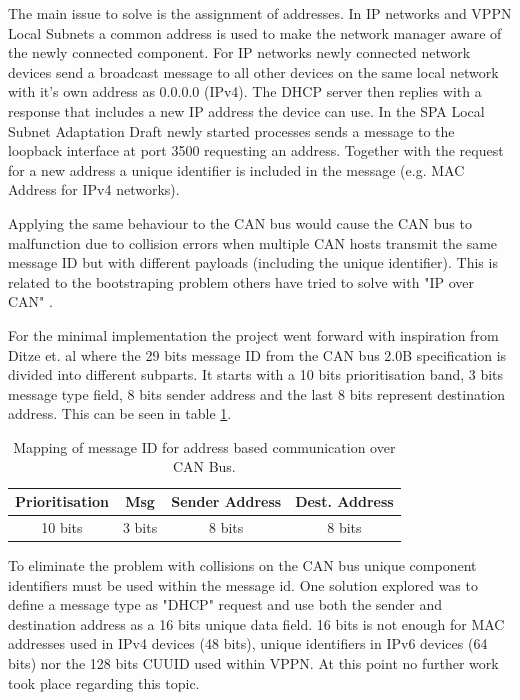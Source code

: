 The main issue to solve is the assignment of addresses. In IP networks and VPPN Local
Subnets a common address is used to make the network manager aware of the newly
connected component. For IP networks newly connected network devices send a
broadcast message to all other devices on the same local network with it's own
address as 0.0.0.0 (IPv4). The DHCP server then replies with a response that
includes a new IP address the device can use. In the SPA Local Subnet
Adaptation Draft newly started processes sends a message to the loopback
interface at port 3500 requesting an address. Together with the request for a
new address a unique identifier is included in the message (e.g. MAC Address
for IPv4 networks).

Applying the same behaviour to the CAN bus would cause the CAN bus to
malfunction due to collision errors when multiple CAN hosts transmit the same
message ID but with different payloads (including the unique identifier).
This is related to the bootstraping problem others have tried to solve with
"IP over CAN" \cite{web:draft-ip_over_can, web:porting_ip_can}.

For the minimal implementation the project went forward with inspiration from
Ditze et. al \cite{web:porting_ip_can} where the 29 bits message ID from the
CAN bus 2.0B specification is divided into different subparts. It starts with a 10
bits prioritisation band, 3 bits message type field, 8 bits sender address and
the last 8 bits represent destination address. This can be seen in table
\ref{table:mapping_message_id_to_ip}.

\begin{table}
\centering
    \caption{Mapping of message ID for address based communication over CAN
    Bus.}
    \begin{tabular}{|c|c|c|c|} \hline
    \label{table:mapping_message_id_to_ip}
    Prioritisation & Msg & Sender Address & Dest. Address  \\ \hline
            10 bits & 3 bits & 8 bits & 8 bits \\ \hline
    \end{tabular}
\end{table}

To eliminate the problem with collisions on the CAN bus unique component
identifiers must be used within the message id. One solution explored was to
define a message type as "DHCP" request and use both the sender and destination
address as a 16 bits unique data field. 16 bits is not enough for MAC addresses
used in IPv4 devices (48 bits), unique identifiers in IPv6 devices (64 bits)
nor the 128 bits CUUID used within VPPN. At this point no further work took
place regarding this topic.

